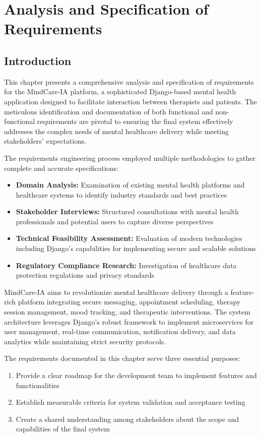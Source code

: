 \chapter{Analysis and Specification of Requirements}

\section*{Introduction}
This chapter presents a comprehensive analysis and specification of requirements for the MindCare-IA platform, a sophisticated Django-based mental health application designed to facilitate interaction between therapists and patients. The meticulous identification and documentation of both functional and non-functional requirements are pivotal to ensuring the final system effectively addresses the complex needs of mental healthcare delivery while meeting stakeholders' expectations.

The requirements engineering process employed multiple methodologies to gather complete and accurate specifications:
\begin{itemize}
    \item \textbf{Domain Analysis:} Examination of existing mental health platforms and healthcare systems to identify industry standards and best practices
    \item \textbf{Stakeholder Interviews:} Structured consultations with mental health professionals and potential users to capture diverse perspectives
    \item \textbf{Technical Feasibility Assessment:} Evaluation of modern technologies including Django's capabilities for implementing secure and scalable solutions
    \item \textbf{Regulatory Compliance Research:} Investigation of healthcare data protection regulations and privacy standards
\end{itemize}

MindCare-IA aims to revolutionize mental healthcare delivery through a feature-rich platform integrating secure messaging, appointment scheduling, therapy session management, mood tracking, and therapeutic interventions. The system architecture leverages Django's robust framework to implement microservices for user management, real-time communication, notification delivery, and data analytics while maintaining strict security protocols.

The requirements documented in this chapter serve three essential purposes:
\begin{enumerate}
    \item Provide a clear roadmap for the development team to implement features and functionalities
    \item Establish measurable criteria for system validation and acceptance testing
    \item Create a shared understanding among stakeholders about the scope and capabilities of the final system
\end{enumerate}


